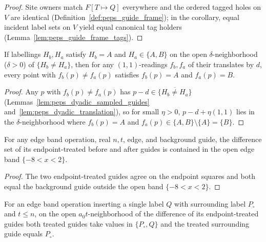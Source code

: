 \begin{proof}\leanok
    Site owners match $F[T\mapsto Q]$ everywhere and the ordered tagged holes on $V$ are identical (Definition~\ref{def:peps_guide_frame}); in the corollary, equal incident label sets on $V$ yield equal canonical tag holders (Lemma~\ref{lem:peps_guide_frame_tags}).
\end{proof}

\begin{lemma}
    \label{thm:peps_reading_changed_values}
    \leanok
    If labellings $H_b,H_a$ satisfy $H_b=A$ and $H_a\in\{A,B\}$ on the open $\delta$-neighborhood ($\delta>0$) of $\{H_b\ne H_a\}$, then for any $(1,1)$-readings $f_b,f_a$ of their translates by $d$, every point with $f_b(p)\ne f_a(p)$ satisfies $f_b(p)=A$ and $f_a(p)=B$.
\end{lemma}

\begin{proof}\leanok
    Any $p$ with $f_b(p)\ne f_a(p)$ has $p-d\in\overline{\{H_b\ne H_a\}}$ (Lemmas~\ref{lem:peps_dyadic_sampled_guides} and~\ref{lem:peps_dyadic_translation}), so for small $\eta>0$, $p-d+\eta(1,1)$ lies in the $\delta$-neighborhood where $f_b(p)=A$ and $f_a(p)\in\{A,B\}\setminus\{A\}=\{B\}$.
\end{proof}

\begin{lemma}
    \label{thm:peps_treated_band_support}
    \leanok
    For any edge band operation, real $n,t$, edge, and background guide, the difference set of its endpoint-treated before and after guides is contained in the open edge band $\{-8<x<2\}$.
\end{lemma}

\begin{proof}\leanok
    The two endpoint-treated guides agree on the endpoint squares and both equal the background guide outside the open band $\{-8<x<2\}$.
\end{proof}

\begin{lemma}
    \label{thm:peps_treated_band_values}
    \leanok
    For an edge band operation inserting a single label $Q$ with surrounding label $P_\circ$ and $t\le n$, on the open $a_0t$-neighborhood of the difference of its endpoint-treated guides both treated guides take values in $\{P_\circ,Q\}$ and the treated surrounding guide equals $P_\circ$.
\end{lemma}

